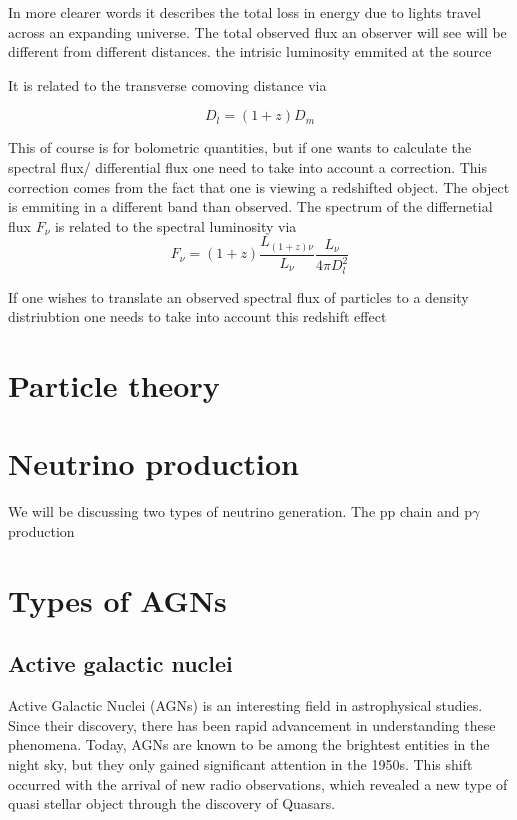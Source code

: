 \documentclass[11pt]{article}
\begin{document}
In more clearer words it describes the total loss in energy due to lights travel across an expanding universe. 
The total observed flux an observer will see will be different from different distances.  the intrisic luminosity emmited at the source


It is related to the transverse comoving distance via 

\begin{equation}
    D_l = (1+z)D_m
\end{equation}

This of course is for bolometric quantities, but if one wants to calculate the spectral 
flux/ differential flux one need to take into account a correction. This correction comes 
from the fact that one is viewing a redshifted object. The object is emmiting in a different band than 
observed. The spectrum of the differnetial flux $F_\nu$ is related to the spectral luminosity via
\begin{equation}
    F_\nu = (1+z) \frac{L_{(1+z)\nu}}{L_\nu}\frac{L_\nu}{4\pi D_l^2}
\end{equation}

If one wishes to translate an observed spectral flux of particles to a density distriubtion one needs to take into account this redshift effect


\section{Particle theory}

\section{Neutrino production}

We will be discussing two types of neutrino generation. The pp chain and p$\gamma$ production
\section{Types of AGNs}

\subsection{Active galactic nuclei}



Active Galactic Nuclei (AGNs) is an interesting field in astrophysical studies. 
Since their discovery, there has been rapid advancement in understanding these phenomena.
Today, AGNs are known to be among the brightest entities in the night sky,
but they only gained significant attention in the 1950s. 
This shift occurred with the arrival of new radio observations, which revealed a new type of quasi stellar
object through the discovery of Quasars.
\end{document}
